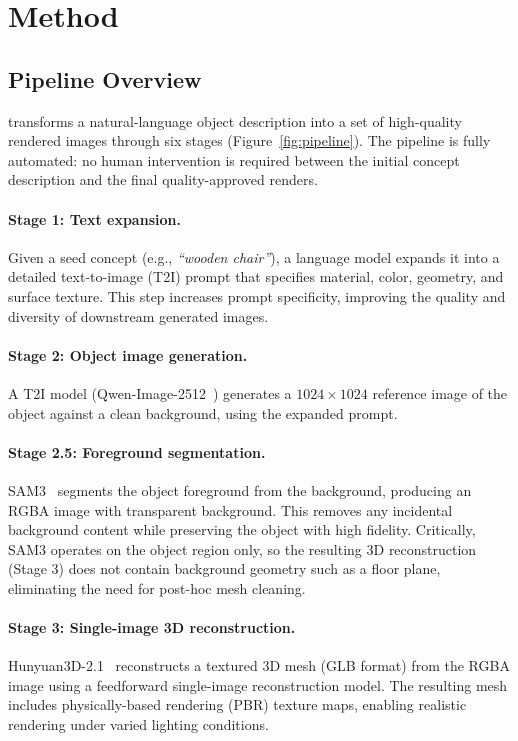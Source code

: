 \section{Method}
\label{sec:method}

\subsection{Pipeline Overview}
\label{sec:method:pipeline}

\aris{} transforms a natural-language object description into a set of
high-quality rendered images through six stages (Figure~\ref{fig:pipeline}).
The pipeline is fully automated: no human intervention is required between
the initial concept description and the final quality-approved renders.

\paragraph{Stage 1: Text expansion.}
Given a seed concept (e.g., \textit{``wooden chair''}),
a language model expands it into a detailed text-to-image (T2I) prompt
that specifies material, color, geometry, and surface texture.
This step increases prompt specificity, improving the quality and diversity
of downstream generated images.

\paragraph{Stage 2: Object image generation.}
A T2I model (Qwen-Image-2512~\cite{PLACEHOLDER_qwen_image_2512_verify})
generates a $1024 \times 1024$ reference image of the object
against a clean background, using the expanded prompt.

\paragraph{Stage 2.5: Foreground segmentation.}
SAM3~\cite{PLACEHOLDER_sam3_verify} segments the object foreground from the background,
producing an RGBA image with transparent background.
This removes any incidental background content while preserving the object with high fidelity.
Critically, SAM3 operates on the object region only, so the resulting 3D reconstruction
(Stage 3) does not contain background geometry such as a floor plane,
eliminating the need for post-hoc mesh cleaning.

\paragraph{Stage 3: Single-image 3D reconstruction.}
Hunyuan3D-2.1~\cite{PLACEHOLDER_hunyuan3d_verify} reconstructs a textured 3D mesh (GLB format)
from the RGBA image using a feedforward single-image reconstruction model.
The resulting mesh includes physically-based rendering (PBR) texture maps,
enabling realistic rendering under varied lighting conditions.


